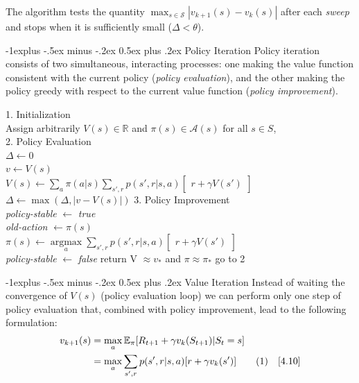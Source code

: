 \documentclass[10pt,landscape]{article}
\makeatletter
\renewcommand{\subsection}{\@startsection{subsection}{2}{0mm}%
                                {-1explus -.5ex minus -.2ex}%
                                {0.5ex plus .2ex}%
                                {\normalfont\normalsize\bfseries}}
\newcommand\numberthis{\addtocounter{equation}{1}\tag{\theequation}}
\DeclareMathOperator*{\argmax}{argmax}
\makeatother
\begin{document}
\begin{multicols}{3}
The algorithm tests the quantity $\max_{s \in \mathcal{S}} |v_{k+1}(s) - v_k(s)|$ after each \emph{sweep} and stops when it is sufficiently small ($\Delta < \theta$).

\subsection{Policy Iteration}
Policy iteration consists of two simultaneous, interacting processes: one making the value function consistent with the current policy (\emph{policy evaluation}), and the other making the policy greedy with respect to the current value function (\emph{policy improvement}). 
\begin{algorithm}[H]
 1. Initialization \\
 Assign arbitrarily $V(s) \in \mathbb{R}$ and $\pi(s) \in \mathcal{A}(s)$  for all $s \in S$,\\
 2. Policy Evaluation \\
 $\Delta \leftarrow 0$ \\
 \While{$\Delta \ge \theta$}
 {
   {
        $v \leftarrow V(s)$\\
        $V(s) \leftarrow \sum\limits_a \pi(a|s) \sum\limits_{s', r} p(s',r | s, a) \begin{bmatrix}
                r + \gamma V(s')
        \end{bmatrix}$ \\
        $\Delta \leftarrow \max(\Delta, | v - V(s)|)$
        }
}
 3. Policy Improvement \\
 \emph{policy-stable} $ \leftarrow $ \emph{true} \\
   {
        \emph{old-action} $\leftarrow \pi(s)$\\
        $\pi(s) \leftarrow \argmax\limits_a\sum\limits_{s', r} p(s',r | s, a)  \begin{bmatrix}
            r + \gamma V(s')
        \end{bmatrix}$ \\
        {
        	\emph{policy-stable} $\leftarrow$ \emph{false}
        }
  }
{
	return V $\approx v_*$ and $\pi \approx \pi_*$
}
\Else
{
	go to 2
}

\caption{Policy Iteration - estimating $\pi \sim \pi_*$ - deterministic policy - [§4.3]}
\end{algorithm}

\subsection{Value Iteration}
Instead of waiting the convergence of $V(s)$ (policy evaluation loop) we can perform only one step of policy evaluation that, combined with policy improvement, lead to the following formulation:
\begin{align*}
v_{k+1}(s) & = \max_a \mathbb{E}_{\pi}[R_{t+1} + \gamma v_{k}(S_{t+1}) | S_t = s] \\
& = \max_a \sum_{s' ,r} p(s',r | s, a)  [r + \gamma v_{k}(s')] \numberthis  \quad [4.10]
\end{align*}


\end{multicols}
\end{document}
